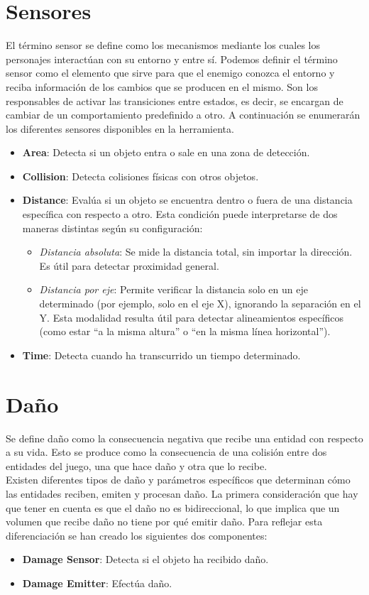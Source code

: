 \section{Sensores}
\label{subsec:sensores}
El término sensor se define como los mecanismos mediante los cuales los personajes interactúan con su entorno y entre sí.
Podemos definir el término sensor como el elemento que sirve para que el enemigo conozca el entorno y reciba información de los cambios que se producen en el mismo. Son los responsables de activar las transiciones entre estados, es decir, se encargan de cambiar de un comportamiento predefinido a otro.
A continuación se enumerarán los diferentes sensores disponibles en la herramienta.
\begin{itemize}
	\item \textbf{Area}: Detecta si un objeto entra o sale en una zona de detección.
	\item \textbf{Collision}: Detecta colisiones físicas con otros objetos.
	\item \textbf{Distance}: Evalúa si un objeto se encuentra dentro o fuera de una distancia específica con respecto a otro. Esta condición puede interpretarse de dos maneras distintas según su configuración:
	\begin{itemize}
	    \item \textit{Distancia absoluta}: Se mide la distancia total, sin importar la dirección. Es útil para detectar proximidad general.
	    \item \textit{Distancia por eje}: Permite verificar la distancia solo en un eje determinado (por ejemplo, solo en el eje X), ignorando la separación en el Y. Esta modalidad resulta útil para detectar alineamientos específicos (como estar “a la misma altura” o “en la misma línea horizontal”).
	\end{itemize}
	\item \textbf{Time}: Detecta cuando ha transcurrido un tiempo determinado.
\end{itemize}
\section{Daño}
\label{subsec:dano}
Se define daño como la consecuencia negativa que recibe una entidad con respecto a su vida. Esto se produce como la consecuencia de una colisión entre dos entidades del juego, una que hace daño y otra que lo recibe.\\
Existen diferentes tipos de daño y parámetros específicos que determinan cómo las entidades reciben, emiten y procesan daño.
La primera consideración que hay que tener en cuenta es que el daño no es bidireccional, lo que implica que un volumen que recibe daño no tiene por qué emitir daño. Para reflejar esta diferenciación se han creado los siguientes dos componentes:
\begin{itemize}
    \item \textbf{Damage Sensor}: Detecta si el objeto ha recibido daño.
    \item \textbf{Damage Emitter}: Efectúa daño.
\end{itemize}


